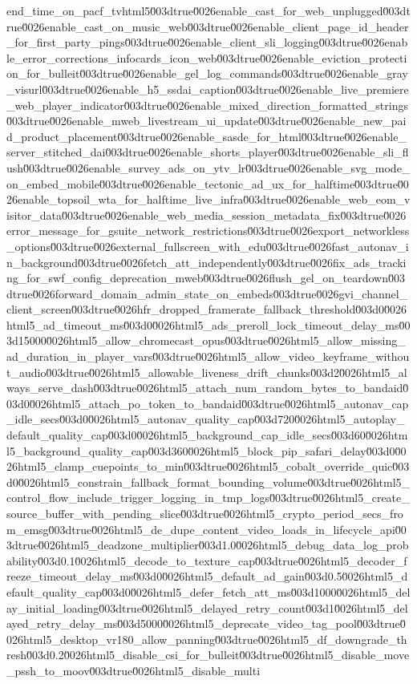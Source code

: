 {end_time_on_pacf_tvhtml5\u003dtrue\u0026enable_cast_for_web_unplugged\u003dtrue\u0026enable_cast_on_music_web\u003dtrue\u0026enable_client_page_id_header_for_first_party_pings\u003dtrue\u0026enable_client_sli_logging\u003dtrue\u0026enable_error_corrections_infocards_icon_web\u003dtrue\u0026enable_eviction_protection_for_bulleit\u003dtrue\u0026enable_gel_log_commands\u003dtrue\u0026enable_gray_visurl\u003dtrue\u0026enable_h5_ssdai_caption\u003dtrue\u0026enable_live_premiere_web_player_indicator\u003dtrue\u0026enable_mixed_direction_formatted_strings\u003dtrue\u0026enable_mweb_livestream_ui_update\u003dtrue\u0026enable_new_paid_product_placement\u003dtrue\u0026enable_sasde_for_html\u003dtrue\u0026enable_server_stitched_dai\u003dtrue\u0026enable_shorts_player\u003dtrue\u0026enable_sli_flush\u003dtrue\u0026enable_survey_ads_on_ytv_lr\u003dtrue\u0026enable_svg_mode_on_embed_mobile\u003dtrue\u0026enable_tectonic_ad_ux_for_halftime\u003dtrue\u0026enable_topsoil_wta_for_halftime_live_infra\u003dtrue\u0026enable_web_eom_visitor_data\u003dtrue\u0026enable_web_media_session_metadata_fix\u003dtrue\u0026error_message_for_gsuite_network_restrictions\u003dtrue\u0026export_networkless_options\u003dtrue\u0026external_fullscreen_with_edu\u003dtrue\u0026fast_autonav_in_background\u003dtrue\u0026fetch_att_independently\u003dtrue\u0026fix_ads_tracking_for_swf_config_deprecation_mweb\u003dtrue\u0026flush_gel_on_teardown\u003dtrue\u0026forward_domain_admin_state_on_embeds\u003dtrue\u0026gvi_channel_client_screen\u003dtrue\u0026hfr_dropped_framerate_fallback_threshold\u003d0\u0026html5_ad_timeout_ms\u003d0\u0026html5_ads_preroll_lock_timeout_delay_ms\u003d15000\u0026html5_allow_chromecast_opus\u003dtrue\u0026html5_allow_missing_ad_duration_in_player_vars\u003dtrue\u0026html5_allow_video_keyframe_without_audio\u003dtrue\u0026html5_allowable_liveness_drift_chunks\u003d2\u0026html5_always_serve_dash\u003dtrue\u0026html5_attach_num_random_bytes_to_bandaid\u003d0\u0026html5_attach_po_token_to_bandaid\u003dtrue\u0026html5_autonav_cap_idle_secs\u003d0\u0026html5_autonav_quality_cap\u003d720\u0026html5_autoplay_default_quality_cap\u003d0\u0026html5_background_cap_idle_secs\u003d60\u0026html5_background_quality_cap\u003d360\u0026html5_block_pip_safari_delay\u003d0\u0026html5_clamp_cuepoints_to_min\u003dtrue\u0026html5_cobalt_override_quic\u003d0\u0026html5_constrain_fallback_format_bounding_volume\u003dtrue\u0026html5_control_flow_include_trigger_logging_in_tmp_logs\u003dtrue\u0026html5_create_source_buffer_with_pending_slice\u003dtrue\u0026html5_crypto_period_secs_from_emsg\u003dtrue\u0026html5_de_dupe_content_video_loads_in_lifecycle_api\u003dtrue\u0026html5_deadzone_multiplier\u003d1.0\u0026html5_debug_data_log_probability\u003d0.1\u0026html5_decode_to_texture_cap\u003dtrue\u0026html5_decoder_freeze_timeout_delay_ms\u003d0\u0026html5_default_ad_gain\u003d0.5\u0026html5_default_quality_cap\u003d0\u0026html5_defer_fetch_att_ms\u003d1000\u0026html5_delay_initial_loading\u003dtrue\u0026html5_delayed_retry_count\u003d1\u0026html5_delayed_retry_delay_ms\u003d5000\u0026html5_deprecate_video_tag_pool\u003dtrue\u0026html5_desktop_vr180_allow_panning\u003dtrue\u0026html5_df_downgrade_thresh\u003d0.2\u0026html5_disable_csi_for_bulleit\u003dtrue\u0026html5_disable_move_pssh_to_moov\u003dtrue\u0026html5_disable_multi}

